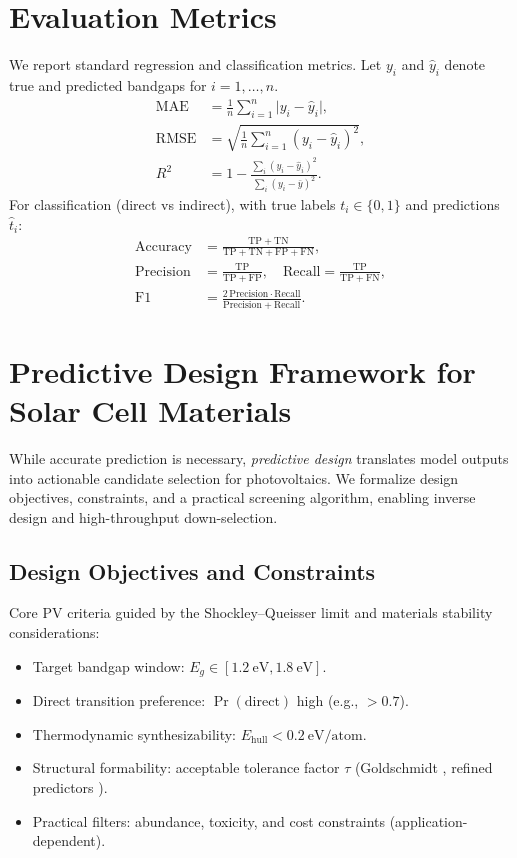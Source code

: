 \documentclass[conference]{IEEEtran}
\begin{document}
\section{Evaluation Metrics}\label{sec:metrics}
We report standard regression and classification metrics. Let $y_i$ and $\hat{y}_i$ denote true and predicted bandgaps for $i=1,\dots,n$.
\begin{align}
\mathrm{MAE} &= \frac{1}{n}\sum_{i=1}^{n} \lvert y_i - \hat{y}_i \rvert, \\
\mathrm{RMSE} &= \sqrt{ \frac{1}{n}\sum_{i=1}^{n} (y_i - \hat{y}_i)^2 }, \\
R^2 &= 1 - \frac{\sum_i (y_i - \hat{y}_i)^2}{\sum_i (y_i - \bar{y})^2}.
\end{align}
For classification (direct vs indirect), with true labels $t_i\in\{0,1\}$ and predictions $\hat{t}_i$:
\begin{align}
\mathrm{Accuracy} &= \frac{\mathrm{TP}+\mathrm{TN}}{\mathrm{TP}+\mathrm{TN}+\mathrm{FP}+\mathrm{FN}}, \\
\mathrm{Precision} &= \frac{\mathrm{TP}}{\mathrm{TP}+\mathrm{FP}}, \quad
\mathrm{Recall} = \frac{\mathrm{TP}}{\mathrm{TP}+\mathrm{FN}}, \\
\mathrm{F1} &= \frac{2\,\mathrm{Precision}\cdot \mathrm{Recall}}{\mathrm{Precision}+\mathrm{Recall}}.
\end{align}

\section{Predictive Design Framework for Solar Cell Materials}\label{sec:design}
While accurate prediction is necessary, \emph{predictive design} translates model outputs into actionable candidate selection for photovoltaics. We formalize design objectives, constraints, and a practical screening algorithm, enabling inverse design and high-throughput down-selection.

\subsection{Design Objectives and Constraints}
Core PV criteria guided by the Shockley--Queisser limit \cite{Shockley1961SQ} and materials stability considerations:
\begin{itemize}
  \item Target bandgap window: $E_g \in [\SI{1.2}{\electronvolt},\SI{1.8}{\electronvolt}]$.
  \item Direct transition preference: $\Pr(\mathrm{direct})$ high (e.g., $>0.7$).
  \item Thermodynamic synthesizability: $E_{\mathrm{hull}} < \SI{0.2}{\electronvolt}/\text{atom}$.
  \item Structural formability: acceptable tolerance factor $\tau$ (Goldschmidt \cite{Goldschmidt1926}, refined predictors \cite{Bartel2019Tolerance}).
  \item Practical filters: abundance, toxicity, and cost constraints (application-dependent).
\end{itemize}
\end{document}
